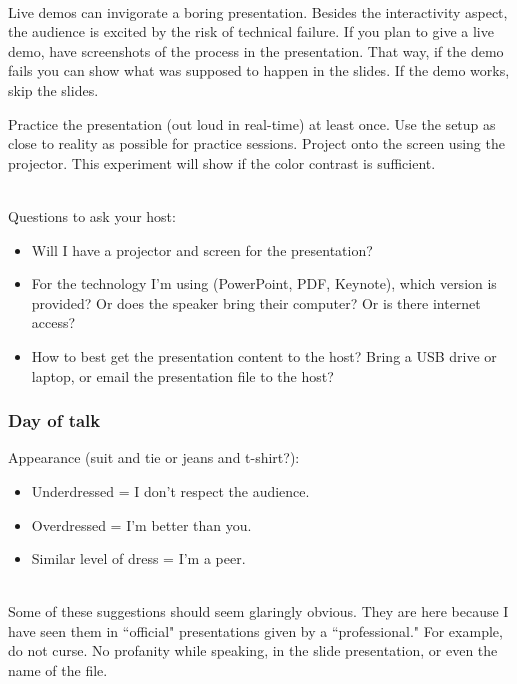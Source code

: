 \ \\


Live demos can invigorate a boring presentation. Besides the interactivity aspect, the audience is excited by the risk of technical failure. 
If you plan to give a live demo, have screenshots of the process in the presentation. That way, if the demo fails you can show what was supposed to happen in the slides. If the demo works, skip the slides.


Practice the presentation (out loud in real-time) at least once.
Use the setup as close to reality as possible for practice sessions. Project onto the screen using the projector. This experiment will show if the color contrast is sufficient.

\ \\

Questions to ask your host:
\begin{itemize}
    \item Will I have a projector and screen for the presentation?
    \item For the technology I'm using (PowerPoint, PDF, Keynote), which version is provided? 
    Or does the speaker bring their computer? 
    Or is there internet access?
    \item How to best get the presentation content to the host? Bring a USB drive or laptop, or email the presentation file to the host?
\end{itemize}


\subsubsection*{Day of talk}

Appearance (suit and tie or jeans and t-shirt?):
\begin{itemize}
    \item Underdressed = I don't respect the audience.
    \item Overdressed = I'm better than you.
    \item Similar level of dress = I'm a peer.
\end{itemize}

\ \\

Some of these suggestions should seem glaringly obvious. They are here because I have seen them in ``official" presentations given by a ``professional." For example, do not curse. No profanity while speaking, in the slide presentation, or even the name of the file.

